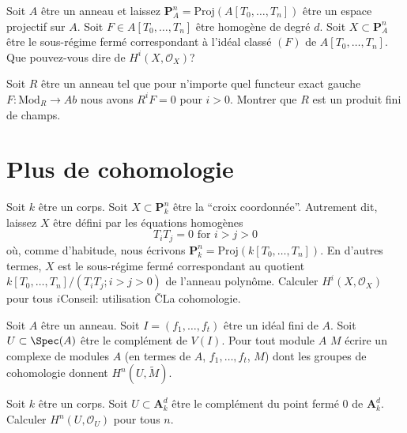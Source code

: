 \begin{exercise}
\label{exercise-cohomology-hypersurface}
Soit $A$ être un anneau et laissez $\mathbf{P}^n_A = \text{Proj}(A[T_0, \ldots, T_n])$
être un espace projectif sur
$A$. Soit $F \in A[T_0, \ldots, T_n]$ être homogène
de degré $d$. Soit $X \subset \mathbf{P}^n_A$ être le
sous-régime fermé correspondant à l'idéal classé $(F)$ de $A[T_0, \ldots,
T_n]$. Que pouvez-vous dire de $H^i(X, \mathcal{O}_X)$?
\end{exercise}

\begin{exercise}
\label{exercise-characterize-finite-product-fields}
Soit $R$ être un anneau tel que pour n'importe quel functeur exact
gauche $F : \text{Mod}_R \to \textit{Ab}$ nous avons $R^iF
= 0$ pour $i > 0$. Montrer que $R$ est un produit fini
de champs.
\end{exercise}






\section{Plus de cohomologie}
\label{section-more-cohomology}

\begin{exercise}
\label{exercise-cohomology-coordinate-axes}
Soit $k$ être un corps. Soit $X \subset \mathbf{P}^n_k$
être la ``croix coordonnée''. Autrement dit, laissez $X$
être défini par les équations homogènes
$$
T_i T_j = 0\text{ for }i > j > 0
$$
où, comme d'habitude, nous écrivons $\mathbf{P}^n_k = \text{Proj}(k[T_0, \ldots, T_n])$. En
d'autres termes, $X$ est le sous-régime fermé correspondant au quotient $k[T_0,
\ldots, T_n]/(T_iT_j; i > j > 0)$ de l'anneau
polynôme. Calculer $H^i(X, \mathcal{O}_X)$ pour tous $i$Conseil: utilisation {\v C}La cohomologie.
\end{exercise}

\begin{exercise}
\label{exercise-compute-cohomology-punctured}
Soit $A$ être un anneau. Soit $I = (f_1,
\ldots, f_t)$ être un idéal fini
de $A$. Soit $U \subset \Spec(A)$ être le complément de
$V(I)$. Pour tout module $A$ $M$ écrire un
complexe de modules $A$ (en termes de $A$, $f_1, \ldots,
f_t$, $M$) dont les groupes de cohomologie donnent $H^n(U, \widetilde{M})$.
\end{exercise}

\begin{exercise}
\label{exercise-compute-cohomology-affine-space-punctured}
Soit $k$ être un corps. Soit $U \subset \mathbf{A}^d_k$
être le complément du point fermé $0$ de
$\mathbf{A}^d_k$. Calculer $H^n(U, \mathcal{O}_U)$ pour tous $n$.
\end{exercise}

